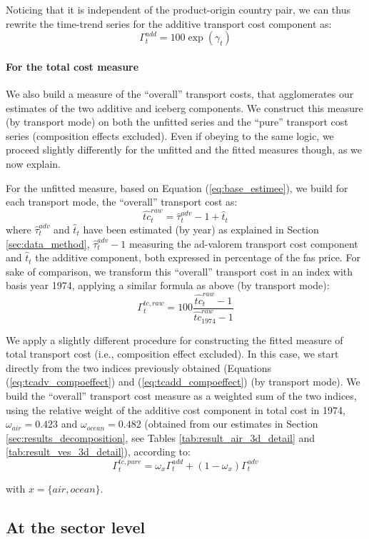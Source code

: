 \documentclass[a4paper,11pt]{article}
\begin{document}
Noticing that it is independent of the product-origin country pair, we can thus rewrite the time-trend series for the additive transport cost component as:
\begin{equation}
\Gamma^{add}_t  = 100\exp(\gamma_t)  \label{eq:tcadd_compoeffect}
\end{equation}

\paragraph{For the total cost measure} We also build a measure of the ``overall'' transport costs, that agglomerates our estimates of the two additive and iceberg components. We construct this measure (by transport mode) on both the unfitted series and the ``pure'' transport cost series (composition effects excluded). Even if obeying to the same logic, we proceed slightly differently for the unfitted and the fitted measures though, as we now explain.\smallskip

For the unfitted measure, based on Equation (\ref{eq:base_estimee}), we build for each transport mode, the ``overall'' transport cost as:
$$\widehat{tc}^{raw}_t= \widehat{\tau}^{adv}_t -1 + \widehat{t}_t$$
\noindent where $\widehat{\tau}^{adv}_t$ and $\widehat{t}_t$ have been estimated (by year) as explained in Section \ref{sec:data_method}, $\widehat{\tau}^{adv}_t-1$ measuring the ad-valorem transport cost component and $\widehat{t}_t$ the additive component, both expressed in percentage of the fas price. For sake of comparison, we transform this ``overall'' transport cost in an index with basis year 1974, applying a similar formula as above (by transport mode):
$$\Gamma^{tc, raw}_t = 100\frac{\widehat{tc}^{raw}_t -1 }{\widehat{tc}^{raw}_{1974}-1}$$

We apply a slightly different procedure for constructing the fitted measure of total transport cost (i.e., composition effect excluded). In this case, we start directly from the two indices previously obtained (Equations (\ref{eq:tcadv_compoeffect}) and (\ref{eq:tcadd_compoeffect}) (by transport mode). We build the ``overall'' transport cost measure as a weighted sum of the two indices, using the relative weight of the additive cost component in total cost in 1974, $\omega_{air}= 0.423$ and $\omega_{ocean}= 0.482$ (obtained from our estimates in Section \ref{sec:results_decomposition}, see Tables \ref{tab:result_air_3d_detail} and \ref{tab:result_ves_3d_detail}), according to:
$$\Gamma^{tc, pure}_t = \omega_{x}\Gamma^{add}_t +(1-\omega_{x})\Gamma^{adv}_t $$

\noindent with $x=\{air, ocean\}$. 

\subsection{At the sector level}

\end{document}
